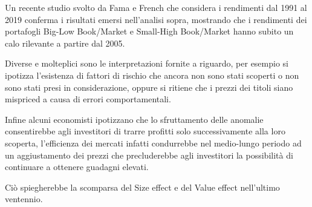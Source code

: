 Un recente studio svolto da Fama e French che considera i rendimenti dal 1991 al 2019 conferma i risultati emersi nell'analisi sopra, mostrando che i rendimenti dei portafogli Big-Low Book/Market e Small-High Book/Market hanno subito un calo rilevante a partire dal 2005. 

Diverse e molteplici sono le interpretazioni fornite a riguardo, per esempio si ipotizza l'esistenza di fattori di rischio che ancora non sono stati scoperti o non sono stati presi in considerazione, oppure si ritiene che i prezzi dei titoli siano mispriced a causa di errori comportamentali. 

Infine alcuni economisti ipotizzano che lo sfruttamento delle anomalie consentirebbe agli investitori di trarre profitti solo successivamente alla loro scoperta, l'efficienza dei mercati infatti condurrebbe nel medio-lungo periodo ad un aggiustamento dei prezzi che precluderebbe agli investitori la possibilità di continuare a ottenere guadagni elevati.  

Ciò spiegherebbe la scomparsa del Size effect e del Value effect nell'ultimo ventennio. 

 